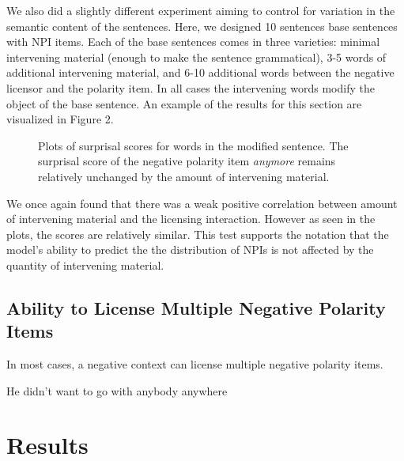 \documentclass[11pt, round]{article}
\begin{document}
We also did a slightly different experiment aiming to control for variation in the semantic content of the sentences. Here, we designed 10 sentences base sentences with NPI items. Each of the base sentences comes in three varieties: minimal intervening material (enough to make the sentence grammatical), 3-5 words of additional intervening material, and 6-10 additional words between the negative licensor and the polarity item. In all cases the intervening words modify the object of the base sentence. An example of the results for this section are visualized in Figure 2.

\begin{figure}
    \centering
    \caption{Plots of surprisal scores for words in the modified sentence. The surprisal score of the negative polarity item \textit{anymore} remains relatively unchanged by the amount of intervening material.}
\end{figure}

We once again found that there was a weak positive correlation between amount of intervening material and the licensing interaction. However as seen in the plots, the scores are relatively similar. This test supports the notation that the model's ability to predict the the distribution of NPIs is not affected by the quantity of intervening material.

\subsection{Ability to License Multiple Negative Polarity Items}
In most cases, a negative context can license multiple negative polarity items.
\begin{exe}
\ex
\begin{xlist}
\ex He didn't want to go with anybody anywhere
\end{xlist}
\end{exe} 

\section{Results}


\end{document}
